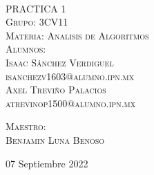 \begin{titlepage}
\begin{minipage}[c][0.81\textheight][t]{0.25\textwidth}
\begin{center}
    \end{center}
  \end{minipage}
  \begin{minipage}[c][0.81\textheight][t]{0.75\textwidth}
    \begin{center}
      \vspace{1cm}

      {\color{black}{\large\scshape Semestre 2023-1}}\\[.2in]

      \vspace{0.5cm}            

      \textsc{\LARGE PRACTICA 1}\\[1.5cm]
      \textsc{\large Grupo: 3CV11}\\[0.5cm]
      \textsc{\large Materia: Analisis de Algoritmos}\\[0.5cm]
      
      {\color{black}\textsc{\large Alumnos:}}\\[0.5cm]
      \textsc{\large {Isaac Sánchez Verdiguel}}\\[1cm]
      \textsc{ {isanchezv1603@alumno.ipn.mx}}\\[1cm]   
      \textsc{\large {Axel Treviño Palacios}}\\[1cm]
      \textsc{ {atrevinop1500@alumno.ipn.mx}}\\[1cm]   
      
      
      
      \vspace{0.5cm}

      {\large\scshape 
        {\color{black}Maestro:}\\[0.3cm] {Benjamin Luna Benoso}}\\[.2in]

      \vspace{0.5cm}
       
      \large{07 Septiembre 2022}
    \end{center}
  \end{minipage}
\end{titlepage}
